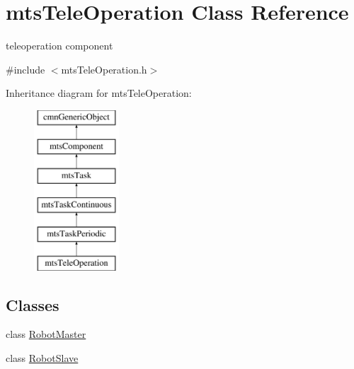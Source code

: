 \hypertarget{classmts_tele_operation}{\section{mts\-Tele\-Operation Class Reference}
\label{classmts_tele_operation}
}


teleoperation component  




{\ttfamily \#include $<$mts\-Tele\-Operation.\-h$>$}

Inheritance diagram for mts\-Tele\-Operation\-:\begin{figure}[H]
\begin{center}
\leavevmode
\includegraphics[height=6.000000cm]{d0/d58/classmts_tele_operation}
\end{center}
\end{figure}
\subsection*{Classes}
\begin{DoxyCompactItemize}
\item 
class \hyperlink{classmts_tele_operation_1_1_robot_master}{Robot\-Master}
\item 
class \hyperlink{classmts_tele_operation_1_1_robot_slave}{Robot\-Slave}
\end{DoxyCompactItemize}
